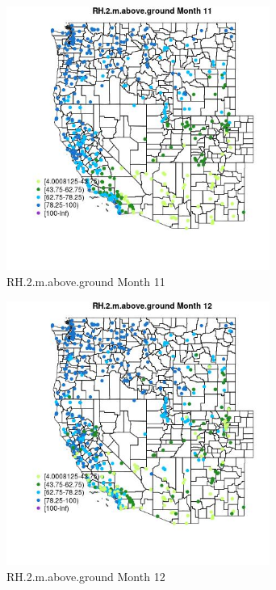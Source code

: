 \begin{figure} 
\centering  
\includegraphics[width=0.77\textwidth]{Code_Outputs/Report_ML_input_PM25_Step4_part_e_de_duplicated_aves_compiled_2019-05-14wNAs_MapObsMo11RH2maboveground.jpg} 
\caption{\label{fig:Report_ML_input_PM25_Step4_part_e_de_duplicated_aves_compiled_2019-05-14wNAsMapObsMo11RH2maboveground}RH.2.m.above.ground Month 11} 
\end{figure} 
 

\begin{figure} 
\centering  
\includegraphics[width=0.77\textwidth]{Code_Outputs/Report_ML_input_PM25_Step4_part_e_de_duplicated_aves_compiled_2019-05-14wNAs_MapObsMo12RH2maboveground.jpg} 
\caption{\label{fig:Report_ML_input_PM25_Step4_part_e_de_duplicated_aves_compiled_2019-05-14wNAsMapObsMo12RH2maboveground}RH.2.m.above.ground Month 12} 
\end{figure} 
 


